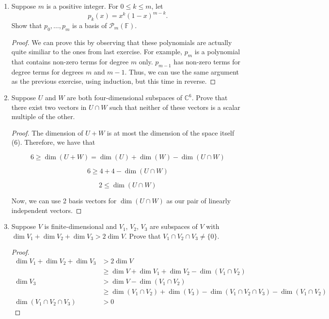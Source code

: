 \begin{enumerate}
\begin{proof}
                Therefore by induction for any $m \in \mathbb N$, $p_0, \dots, p_m$ is a basis for $\mathcal P_m(\F)$.
            \end{proof}


            \item[10] Suppose $m$ is a positive integer. For $0 \leq k \leq m$, let
            \[
                p_k(x) = x^k(1-x)^{m-k}.
            \]
            Show that $p_0, \ldots, p_m$ is a basis of $\mathcal{P}_m(\mathbb{F})$.


            \begin{proof}
                We can prove this by observing that these polynomials are actually quite similiar to the ones from last exercise. For example, $p_m$ is a polynomial that contains non-zero terms for degree $m$ only. $p_{m-1}$ has non-zero terms for degree terms for degrees $m$ and $m-1$. Thus, we can use the same argument as the previous exercise, using induction, but this time in reverse.
            \end{proof}


            \item[11] Suppose $U$ and $W$ are both four-dimensional subspaces of $\mathbb{C}^6$. Prove that there exist two vectors in $U \cap W$ such that neither of these vectors is a scalar multiple of the other.
            
            \begin{proof}
                The dimension of $U + W$ is at most the dimension of the space itself (6). Therefore, we have that 

                $$6 \geq \dim(U + W) = \dim(U) + \dim(W) - \dim(U \cap W)$$

                $$6 \geq 4 + 4 - \dim(U \cap W)$$

                $$2 \leq \dim(U \cap W)$$

                Now, we can use 2 basis vectors for $\dim(U \cap W)$ as our pair of linearly independent vectors.
            \end{proof}


            \item[15] Suppose $V$ is finite-dimensional and $V_1$, $V_2$, $V_3$ are subspaces of $V$ with $\dim V_1 + \dim V_2 + \dim V_3 > 2 \dim V$. Prove that $V_1 \cap V_2 \cap V_3 \neq \{0\}$.
            
            \begin{proof}
                \begin{align*}
                    \dim V_1 + \dim V_2 + \dim V_3 &> 2 \dim V \\
                    &\geq \dim V + \dim V_1 + \dim V_2 - \dim(V_1 \cap V_2) \\
                    \dim V_3 &> \dim V - \dim(V_1 \cap V_2) \\
                    &\geq \dim(V_1 \cap V_2) + \dim(V_3) - \dim(V_1 \cap V_2 \cap V_3) - \dim(V_1 \cap V_2) \\
                    \dim(V_1 \cap V_2 \cap V_3) &> 0
                \end{align*}
            \end{proof}


\end{enumerate}
